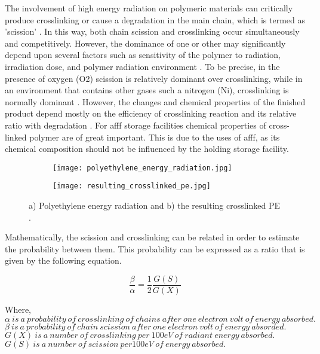 The involvement of high energy radiation on polymeric materials can critically produce crosslinking or cause a degradation in the main chain, which is termed as 'scission' \cite{meola2005cross}. In this way, both chain scission and crosslinking occur simultaneously and competitively. However, the dominance of one or other may significantly depend upon several factors such as sensitivity of the polymer to radiation, irradiation dose, and polymer radiation environment \cite{meola2005cross}. To be precise, in the presence of oxygen (O2) scission is relatively dominant over crosslinking, while in an environment that contains other gases such a nitrogen (Ni), crosslinking is normally dominant \cite{meola2005cross}. However, the changes and chemical properties of the finished product depend mostly on the efficiency of crosslinking reaction and its relative ratio with degradation \cite{meola2005cross}. For \acrshort{afff} storage facilities chemical properties of cross-linked polymer are of great important. This is due to the uses of \acrshort{afff}, as its chemical composition should not be influenced by the holding storage facility.

\begin{figure}[H]
\captionsetup[subfigure]{justification=raggedright}

\centering

\begin{subfigure}{.9\textwidth}
    \centering
    \texttt{[image: polyethylene\_energy\_radiation.jpg]}
    \caption{}
\end{subfigure}
\begin{subfigure}{.9\textwidth}
    \centering
    \texttt{[image: resulting\_crosslinked\_pe.jpg]}
    \caption{}
\end{subfigure}

\caption{a) Polyethylene energy radiation and b) the resulting crosslinked PE \cite{meola2005cross}.}
\label{ch3:figure:radiation}
\end{figure}

Mathematically, the scission and crosslinking can be related in order to estimate the probability between them. This probability can be expressed as a ratio that is given by the following equation.

\begin{equation}
    \frac{\beta}{\alpha}=\frac{1}{2}\frac{G(S)}{G(X)}
\end{equation}

\begin{doublespace}
\noindent Where, \\
$\alpha\ is\ a\ probability\ of\ crosslinking\ of\ chains\ after\ one\ electron\ volt\ of\ energy\ absorbed.$ \\
$\beta\ is\ a\ probability\ of\ chain\ scission\ after\ one\ electron\ volt\ of\ energy\ absorded.$ \\
$G(X)\ is\ a\ number\ of\ crosslinking\ per\ 100eV\ of\ radiant\ energy\ absorbed.$ \\
$G(S)\ is\ a\ number\ of\ scission\ per 100eV\ of\ energy\ absorbed.$ \\
\end{doublespace}

